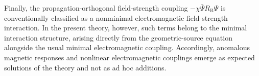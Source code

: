 Finally, the propagation-orthogonal field-strength coupling $-\chi\bar{\Psi}R_{\mathrm{B}}\Psi$ is conventionally classified as a nonminimal electromagnetic field-strength interaction. In the present theory, however, such terms belong to the minimal interaction structure, arising directly from the geometric-source equation alongside the usual minimal electromagnetic coupling. Accordingly, anomalous magnetic responses and nonlinear electromagnetic couplings emerge as expected solutions of the theory and not as ad hoc additions.
